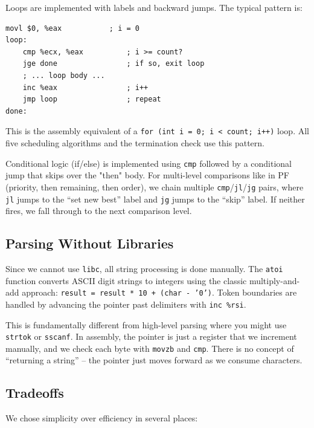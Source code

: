 \documentclass[a4paper,12pt]{article}
\begin{document}
Loops are implemented with labels and backward jumps. The typical pattern is:

\begin{lstlisting}[style=AsmStyle]
    movl $0, %eax           ; i = 0
loop:
    cmp %ecx, %eax          ; i >= count?
    jge done                ; if so, exit loop
    ; ... loop body ...
    inc %eax                ; i++
    jmp loop                ; repeat
done:
\end{lstlisting}

This is the assembly equivalent of a \texttt{for (int i = 0; i < count; i++)} loop. All five scheduling algorithms and the termination check use this pattern.

Conditional logic (if/else) is implemented using \texttt{cmp} followed by a conditional jump that skips over the "then" body. For multi-level comparisons like in PF (priority, then remaining, then order), we chain multiple \texttt{cmp}/\texttt{jl}/\texttt{jg} pairs, where \texttt{jl} jumps to the ``set new best'' label and \texttt{jg} jumps to the ``skip'' label. If neither fires, we fall through to the next comparison level.

\subsection{Parsing Without Libraries}

Since we cannot use \texttt{libc}, all string processing is done manually. The \texttt{atoi} function converts ASCII digit strings to integers using the classic multiply-and-add approach: \texttt{result = result * 10 + (char - '0')}. Token boundaries are handled by advancing the pointer past delimiters with \texttt{inc \%rsi}.

This is fundamentally different from high-level parsing where you might use \texttt{strtok} or \texttt{sscanf}. In assembly, the pointer is just a register that we increment manually, and we check each byte with \texttt{movzb} and \texttt{cmp}. There is no concept of ``returning a string'' -- the pointer just moves forward as we consume characters.

\subsection{Tradeoffs}

We chose simplicity over efficiency in several places:
\end{document}
